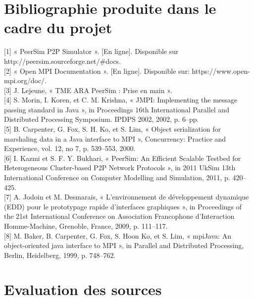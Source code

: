 \documentclass{article}
\begin{document}
		\newpage
		\section{Bibliographie produite dans le cadre du projet}

		[1]    « PeerSim P2P Simulator ». [En ligne]. Disponible sur http://peersim.sourceforge.net/#docs.
		\\[2mm]		
		[2]    « Open MPI Documentation ». [En ligne]. Disponible sur: https://www.open-mpi.org/doc/.       
		\\[2mm]			
		[3]          J. Lejeune, « TME ARA PeerSim : Prise en main ».
		\\[2mm]		
		[4]    S. Morin, I. Koren, et C. M. Krishna, « JMPI: Implementing the message passing standard in Java », in Proceedings 16th International Parallel and Distributed Processing Symposium. IPDPS 2002, 2002, p. 6–pp.          
		\\[2mm]	
		[5]    B. Carpenter, G. Fox, S. H. Ko, et S. Lim, « Object serialization for marshaling data in a Java interface to MPI », Concurrency: Practice and Experience, vol. 12, no 7, p. 539–553, 2000.
		\\[2mm]		
		[6]          I. Kazmi et S. F. Y. Bukhari, « PeerSim: An Efficient Scalable Testbed for Heterogeneous Cluster-based P2P Network Protocols », in 2011 UkSim 13th International Conference on Computer Modelling and Simulation, 2011, p. 420–425. 
		\\[2mm]		
		[7]          A. Jodoin et M. Desmarais, « L’environnement de développement dynamique (EDD) pour le prototypage rapide d’interfaces graphiques », in Proceedings of the 21st International Conference on Association Francophone d’Interaction Homme-Machine, Grenoble, France, 2009, p. 111–117. 
		\\[2mm]
		[8]       M. Baker, B. Carpenter, G. Fox, S. Hoon Ko, et S. Lim, « mpiJava: An object-oriented java interface to MPI », in Parallel and Distributed Processing, Berlin, Heidelberg, 1999, p. 748–762.
		
		\newpage
		\section{Evaluation des sources}
\end{document}
